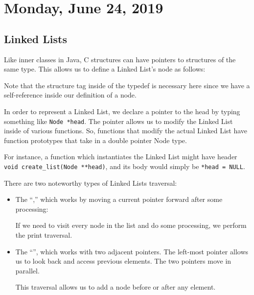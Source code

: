 \section{Monday, June 24, 2019}

\subsection{Linked Lists}
Like inner classes in Java, C structures can have pointers to structures of the same type. This allows us to define a Linked List's node as follows:


\lstset{
caption=Linked List Node}
\begin{center}
\label{Command Line Parameters}
\end{center}


Note that the structure tag inside of the typedef is necessary here since we have a self-reference inside our definition of a node.

In order to represent a Linked List, we declare a pointer to the head by typing something like \verb!Node *head!. The pointer allows us to modify the Linked List inside of various functions. So, functions that modify the actual Linked List have function prototypes that take in a double pointer Node type.  


For instance, a function which instantiates the Linked List might have header \verb!void create_list(Node **head)!, and its body would simply be \verb!*head = NULL!. 





There are two noteworthy types of Linked Lists traversal: \begin{itemize}
    \item The ``,'' which works by moving a current pointer forward after some processing: 
    
    \lstset{
    caption=Print Traversal}
    \begin{center}
    \label{Print Traversal}
    \end{center}
    
    If we need to visit every node in the list and do some processing, we perform the print traversal.
    
    
    \item The ``'', which works with two adjacent pointers. The left-most pointer allows us to look back and access previous elements. The two pointers move in parallel. 
    
    \lstset{
    caption=Tom and Jerry Traversal}
    \begin{center}
    \label{Tom and Jerry}
    \end{center}

    This traversal allows us to add a node before or after any element. 
\end{itemize}


